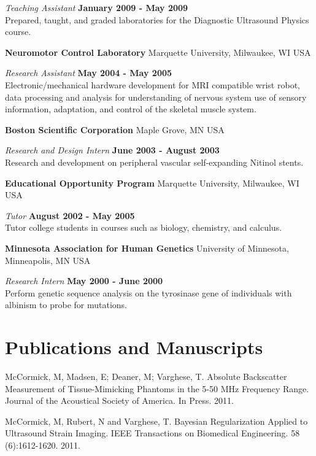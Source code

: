 \documentclass[margin,line]{res}
\begin{document}
\begin{resume}
\vspace{-.3cm}
{\em Teaching Assistant} \hfill {\bf January 2009 - May 2009} \\
Prepared, taught, and graded laboratories for the Diagnostic Ultrasound Physics
course.

{\bf Neuromotor Control Laboratory} Marquette University, Milwaukee, WI USA

\vspace{-.3cm}
{\em Research Assistant} \hfill {\bf May 2004 - May 2005} \\
Electronic/mechanical hardware development for MRI compatible wrist robot, data processing and analysis for understanding of nervous system use of sensory information,  adaptation,  and control of the skeletal muscle system.

{\bf Boston Scientific Corporation} Maple Grove, MN USA

\vspace{-.3cm}
{\em Research and Design Intern} \hfill {\bf June 2003 - August 2003} \\
Research and development on peripheral vascular self-expanding Nitinol stents.

{\bf Educational Opportunity Program} Marquette University, Milwaukee, WI USA

\vspace{-.3cm}
{\em Tutor} \hfill {\bf August 2002 - May 2005} \\
Tutor college students in courses such as biology, chemistry, and calculus.

{\bf Minnesota Association for Human Genetics} University of Minnesota, Minneapolis, MN USA

\vspace{-.3cm}
{\em Research Intern} \hfill {\bf May 2000 - June 2000} \\
Perform genetic sequence analysis on the tyrosinase gene of individuals with albinism to probe for mutations.

\section{\sc Publications and Manuscripts}

McCormick, M, Madsen, E; Deaner, M; Varghese, T.  Absolute Backscatter
Measurement of Tissue-Mimicking Phantoms in the 5-50 MHz Frequency Range.  Journal of the
Acoustical Society of America.  In Press.  2011.

McCormick, M, Rubert, N and Varghese, T.  Bayesian Regularization Applied to
Ultrasound Strain Imaging.  IEEE Transactions on Biomedical Engineering.
58 (6):1612-1620.  2011.


\end{resume}
\end{document}
